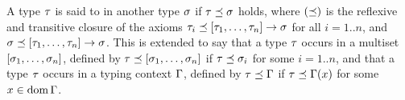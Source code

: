 \begin{definition}
A type $\tau$ is said to  in another type $\sigma$ if
$\tau \preceq \sigma$ holds,
where $(\preceq)$ is the reflexive and transitive closure of
the axioms
$\tau_i \preceq [\tau_1,\hdots,\tau_n] \to \sigma$ for all $i=1..n$,
and $\sigma \preceq [\tau_1,\hdots,\tau_n] \to \sigma$.
This is extended to say that a type $\tau$ occurs in a multiset $[\sigma_1,\hdots,\sigma_n]$,
defined by $\tau \preceq [\sigma_1,\hdots,\sigma_n]$ if $\tau \preceq \sigma_i$ for some $i=1..n$,
and that a type $\tau$ occurs in a typing context $\Gamma$,
defined by $\tau \preceq \Gamma$ if $\tau \preceq \Gamma(x)$ for some $x \in \operatorname{dom}\Gamma$.
\end{definition}
